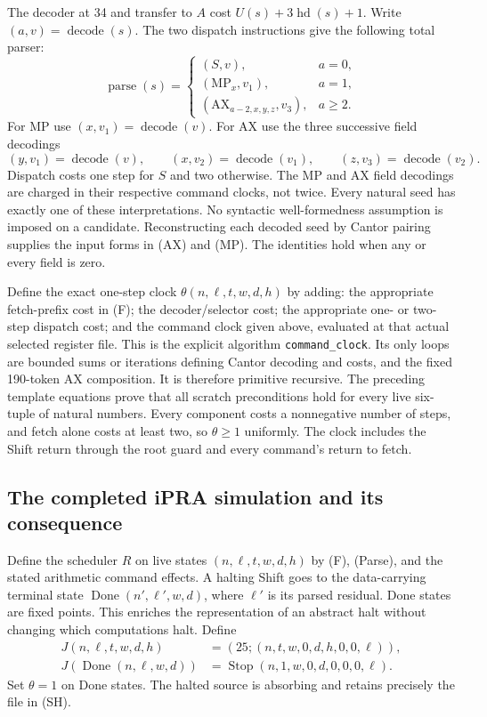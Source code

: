 The decoder at 34 and transfer to $A$ cost
$U(s)+3\operatorname{hd}(s)+1$.  Write
$(a,v)=\operatorname{decode}(s)$.  The two dispatch instructions
give the following total parser:
\[
 \operatorname{parse}(s)=
 \begin{cases}
 (S,v),&a=0,\\
 (\mathrm{MP}_x,v_1),&a=1,\\
 (\mathrm{AX}_{a-2,x,y,z},v_3),&a\ge2.
 \end{cases}                                             \tag{Parse}
\]
For MP use $(x,v_1)=\operatorname{decode}(v)$. For AX use the three
successive field decodings
\[
 (y,v_1)=\operatorname{decode}(v),\qquad
 (x,v_2)=\operatorname{decode}(v_1),\qquad
 (z,v_3)=\operatorname{decode}(v_2).
\]
Dispatch costs one step for $S$ and two otherwise.  The MP and AX field
decodings are charged in their respective command clocks, not twice.
Every natural seed has exactly one of these interpretations.  No syntactic
well-formedness assumption is imposed on a candidate.  Reconstructing each
decoded seed by Cantor pairing supplies the input forms in (AX) and (MP).
The identities hold when any or every field is zero.

Define the exact one-step clock $\theta(n,\ell,t,w,d,h)$ by adding:
the appropriate fetch-prefix cost in (F); the decoder/selector cost;
the appropriate one- or two-step dispatch cost; and the command clock
given above, evaluated at that actual selected register file.
This is the explicit algorithm \texttt{command\_clock}.  Its only loops
are bounded sums or iterations defining Cantor decoding and costs, and the
fixed 190-token AX composition.  It is therefore primitive recursive.
The preceding template equations prove that all scratch preconditions
hold for every live six-tuple of natural numbers.  Every component costs
a nonnegative number of steps, and fetch alone costs at least two, so
$\theta\ge1$ uniformly.  The clock includes the Shift return through
the root guard and every command's return to fetch.

\subsection{The completed iPRA simulation and its consequence}

Define the scheduler $R$ on live states $(n,\ell,t,w,d,h)$ by (F),
(Parse), and the stated arithmetic command effects.  A halting Shift
goes to the data-carrying terminal state
$\operatorname{Done}(n',\ell',w,d)$, where $\ell'$ is its parsed
residual.  Done states are fixed points.  This enriches the representation
of an abstract halt without changing which computations halt.
Define
\begin{align*}
 J(n,\ell,t,w,d,h)&=(25;(n,t,w,0,d,h,0,0,\ell)),\\
 J(\operatorname{Done}(n,\ell,w,d))&=
       \operatorname{Stop}(n,1,w,0,d,0,0,0,\ell).
\end{align*}
Set $\theta=1$ on Done states.  The halted source is absorbing and
retains precisely the file in (SH).

